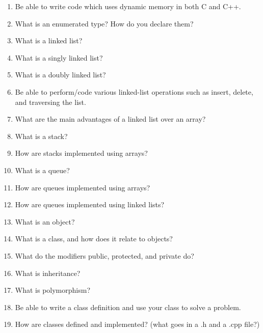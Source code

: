 \documentclass{article}
\begin{document}
\begin{enumerate}
\item Be able to write code which uses dynamic memory in both C and
C++.
\item What is an enumerated type?  How do you declare them?
\item What is a linked list?
\item What is a singly linked list?
\item What is a doubly linked list?
\item Be able to perform/code various linked-list operations such as
insert, delete, and traversing the list.
\item What are the main advantages of a linked list over an array?
\item What is a stack?
\item How are stacks implemented using arrays?
\item What is a queue?
\item How are queues implemented using arrays?
\item How are queues implemented using linked lists?
\item What is an object?
\item What is a class, and how does it relate to objects?
\item What do the modifiers public, protected, and private do?
\item What is inheritance?
\item What is polymorphism?
\item Be able to write a class definition and use your class to solve
a problem.
\item How are classes defined and implemented? (what goes in a .h and
a .cpp file?)
\end{enumerate}
\end{document}

